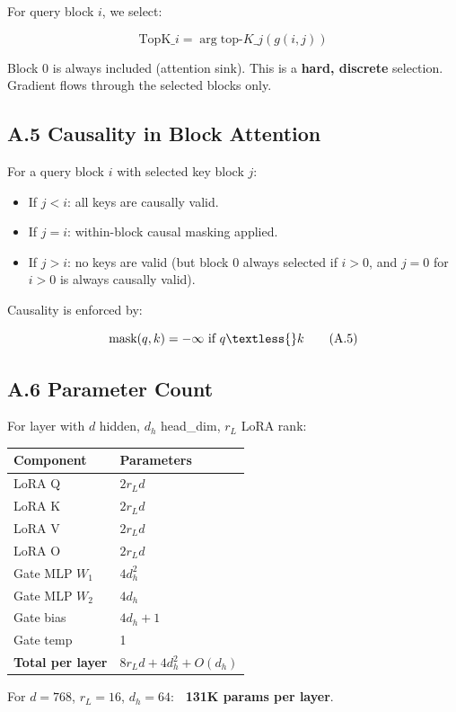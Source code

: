For query block $i$, we select:

\[
\text{TopK}\_i = \arg\text{top-}K\_j (g(i, j))
\tag{A.4}
\]

Block 0 is always included (attention sink). This is a \textbf{hard, discrete} 
selection. Gradient flows through the selected blocks only.

\subsection{A.5 Causality in Block Attention}

For a query block $i$ with selected key block $j$:

\begin{itemize}
\item If $j < i$: all keys are causally valid.
\item If $j = i$: within-block causal masking applied.
\item If $j > i$: no keys are valid (but block 0 always selected if $i > 0$,
  and $j = 0$ for $i > 0$ is always causally valid).

\end{itemize}
Causality is enforced by:

\[
\text{mask}(q, k) = -\infty \text{ if } q \textless{} k
\tag{A.5}
\]

\subsection{A.6 Parameter Count}

For layer with $d$ hidden, $d_h$ head\_dim, $r_L$ LoRA rank:

\begin{table}[H]
\centering
\small
\begin{tabular}{ll}
\toprule
\textbf{Component} & \textbf{Parameters} \\
\midrule
LoRA Q & $2 r_L d$ \\
LoRA K & $2 r_L d$ \\
LoRA V & $2 r_L d$ \\
LoRA O & $2 r_L d$ \\
Gate MLP $W_1$ & $4 d_h^2$ \\
Gate MLP $W_2$ & $4 d_h$ \\
Gate bias & $4 d_h + 1$ \\
Gate temp & 1 \\
\textbf{Total per layer} & $8 r_L d + 4 d_h^2 + O(d_h)$ \\
\bottomrule
\end{tabular}
\end{table}

For $d = 768$, $r_L = 16$, $d_h = 64$: \textbf{~131K params per layer}.

